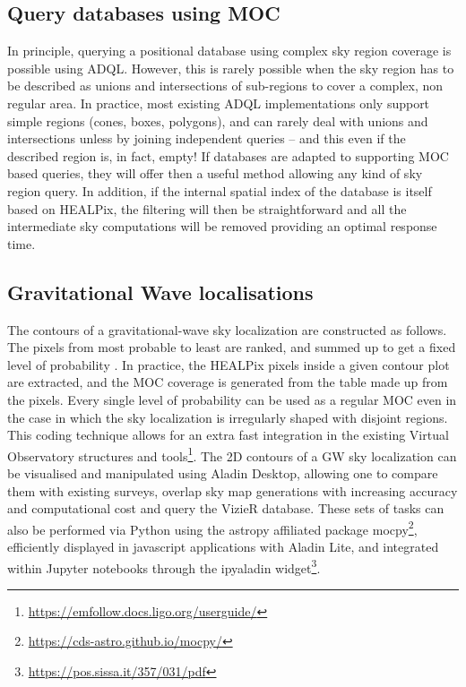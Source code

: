 \documentclass[11pt,a4paper]{ivoa}
\begin{document}
\subsection{Query databases using MOC}
In principle, querying a positional database using complex sky region
coverage is possible using ADQL. However, this is rarely possible
when the sky region has to be described as unions and intersections of
sub-regions to cover a complex, non regular area. In practice, most
existing ADQL implementations only support simple regions
(cones, boxes, polygons), and can rarely deal with unions and
intersections unless by joining independent queries – and this even if
the described region is, in fact, empty!  If databases are adapted to
supporting MOC based queries, they will offer then a useful method
allowing any kind of sky region query. In addition, if the internal
spatial index of the database is itself based on HEALPix, the
filtering will then be straightforward and all the intermediate sky
computations will be removed providing an optimal response time.

\subsection{Gravitational Wave localisations}
The contours of a gravitational-wave sky localization are constructed
as follows. The pixels from most probable to least are ranked, and summed
up to get a fixed level of probability \citep{2014ApJ...795..105S}.
In practice, the HEALPix pixels inside a given contour plot are extracted,
and the MOC coverage is generated from the table made up from the pixels.
Every single level of probability can be used as a regular MOC even in the case in
which the sky localization is irregularly shaped with disjoint regions.
This coding technique allows for an extra fast integration in the existing
Virtual Observatory structures and tools\footnote{\url{https://emfollow.docs.ligo.org/userguide/}}. 
The 2D contours of a GW sky localization can be visualised and
manipulated using Aladin Desktop, allowing one to compare them with
existing surveys, overlap sky map generations with increasing accuracy
and computational cost and query the VizieR database. 
These sets of tasks can also be performed via Python using the astropy
affiliated package mocpy\footnote{\url{https://cds-astro.github.io/mocpy/}},
efficiently displayed in javascript applications
with Aladin Lite, and integrated within Jupyter notebooks through the
ipyaladin widget\footnote{\url{https://pos.sissa.it/357/031/pdf}}. 
\end{document}
